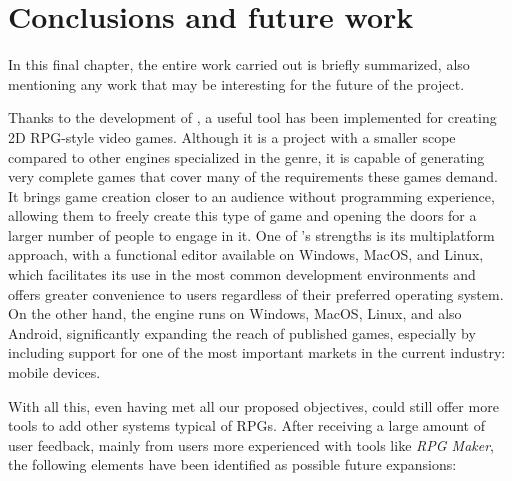 \chapter*{Conclusions and future work}
\label{cap:futurework}



\begin{resumenEng}
In this final chapter, the entire work carried out is briefly summarized, also mentioning any work that may be interesting for the future of the project.
\end{resumenEng}

Thanks to the development of \baker, a useful tool has been implemented for creating 2D RPG-style video games. Although it is a project with a smaller scope compared to other engines specialized in the genre, it is capable of generating very complete games that cover many of the requirements these games demand. It brings game creation closer to an audience without programming experience, allowing them to freely create this type of game and opening the doors for a larger number of people to engage in it. One of \baker's strengths is its multiplatform approach, with a functional editor available on Windows, MacOS, and Linux, which facilitates its use in the most common development environments and offers greater convenience to users regardless of their preferred operating system. On the other hand, the engine runs on Windows, MacOS, Linux, and also Android, significantly expanding the reach of published games, especially by including support for one of the most important markets in the current industry: mobile devices.

\medskip

With all this, even having met all our proposed objectives, \baker{} could still offer more tools to add other systems typical of RPGs. After receiving a large amount of user feedback, mainly from users more experienced with tools like \textit{RPG Maker}, the following elements have been identified as possible future expansions:

